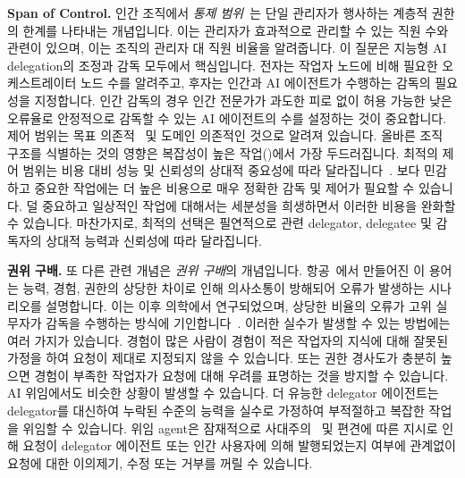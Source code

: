 \documentclass[11pt, a4paper, twocolumn, copyright, goog]{google}
\begin{document}
\textbf{Span of Control.} 인간 조직에서 \emph{통제 범위}~\citep{ouchi1974defining}는 단일 관리자가 행사하는 계층적 권한의 한계를 나타내는 개념입니다. 이는 관리자가 효과적으로 관리할 수 있는 직원 수와 관련이 있으며, 이는 조직의 관리자 대 직원 비율을 알려줍니다. 이 질문은 지능형 AI delegation의 조정과 감독 모두에서 핵심입니다. 전자는 작업자 노드에 비해 필요한 오케스트레이터 노드 수를 알려주고, 후자는 인간과 AI 에이전트가 수행하는 감독의 필요성을 지정합니다. 인간 감독의 경우 인간 전문가가 과도한 피로 없이 허용 가능한 낮은 오류율로 안정적으로 감독할 수 있는 AI 에이전트의 수를 설정하는 것이 중요합니다. 제어 범위는 목표 의존적~\citep{theobald2005many} 및 도메인 의존적인 것으로 알려져 있습니다. 올바른 조직 구조를 식별하는 것의 영향은 복잡성이 높은 작업(\citep{bohte2001structure})에서 가장 두드러집니다. 최적의 제어 범위는 비용 대비 성능 및 신뢰성의 상대적 중요성에 따라 달라집니다~\citep{keren1979optimum}. 보다 민감하고 중요한 작업에는 더 높은 비용으로 매우 정확한 감독 및 제어가 필요할 수 있습니다. 덜 중요하고 일상적인 작업에 대해서는 세분성을 희생하면서 이러한 비용을 완화할 수 있습니다. 마찬가지로, 최적의 선택은 필연적으로 관련 delegator, delegatee 및 감독자의 상대적 능력과 신뢰성에 따라 달라집니다.

\textbf{권위 구배.} 또 다른 관련 개념은 \emph{권위 구배}의 개념입니다. 항공~\citep{alkov1992effect}에서 만들어진 이 용어는 능력, 경험, 권한의 상당한 차이로 인해 의사소통이 방해되어 오류가 발생하는 시나리오를 설명합니다. 이는 이후 의학에서 연구되었으며, 상당한 비율의 오류가 고위 실무자가 감독을 수행하는 방식에 기인합니다~\citep{cosby2004profiles, stucky2022paradox}. 이러한 실수가 발생할 수 있는 방법에는 여러 가지가 있습니다. 경험이 많은 사람이 경험이 적은 작업자의 지식에 대해 잘못된 가정을 하여 요청이 제대로 지정되지 않을 수 있습니다. 또는 권한 경사도가 충분히 높으면 경험이 부족한 작업자가 요청에 대해 우려를 표명하는 것을 방지할 수 있습니다. AI 위임에서도 비슷한 상황이 발생할 수 있습니다. 더 유능한 delegator 에이전트는 delegator를 대신하여 누락된 수준의 능력을 실수로 가정하여 부적절하고 복잡한 작업을 위임할 수 있습니다. 위임 agent은 잠재적으로 사대주의~\citep{sharma2023towards, malmqvist2025sycophancy} 및 편견에 따른 지시로 인해 요청이 delegator 에이전트 또는 인간 사용자에 의해 발행되었는지 여부에 관계없이 요청에 대한 이의제기, 수정 또는 거부를 꺼릴 수 있습니다.
\end{document}
